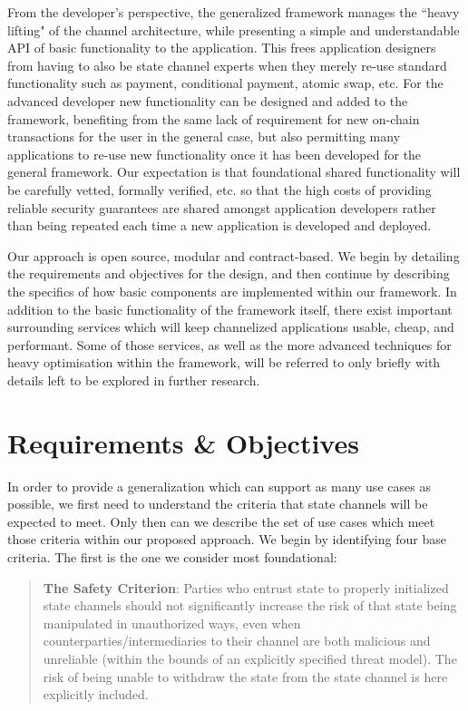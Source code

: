 \documentclass[prb,floatfix,reprint,nofootinbib,amsmath,amssymb,epsfig,pre,floats,letterpaper,groupedaffiliation,tightenlines,allcolors=blue,11pt]{revtex4}
\theoremstyle{definition}
\theoremstyle{definition}
\theoremstyle{definition}
\begin{document}
From the developer's perspective, the generalized framework manages the ``heavy lifting" of the channel architecture, while presenting a simple and understandable API of basic functionality to the application.  This frees application designers from having to also be state channel experts when they merely re-use standard functionality such as payment, conditional payment, atomic swap, etc.  For the advanced developer new functionality can be designed and added to the framework, benefiting from the same lack of requirement for new on-chain transactions for the user in the general case, but also permitting many applications to re-use new functionality once it has been developed for the general framework.  Our expectation is that foundational shared functionality will be carefully vetted, formally verified, etc. so that the high costs of providing reliable security guarantees are shared amongst application developers rather than being repeated each time a new application is developed and deployed.

Our approach is open source, modular and contract-based.  We begin by detailing the requirements and objectives for the design, and then continue by describing the specifics of how basic components are implemented within our framework.  In addition to the basic functionality of the framework itself, there exist important surrounding services which will keep channelized applications usable, cheap, and performant.  Some of those services, as well as the more advanced techniques for heavy optimisation within the framework, will be referred to only briefly with details left to be explored in further research.

\section{Requirements \& Objectives}
\label{section:requirements}

In order to provide a generalization which can support as many use cases as possible, we first need to understand the criteria that state channels will be expected to meet. Only then can we describe the set of use cases which meet those criteria within our proposed approach.  We begin by identifying four base criteria.  The first is the one we consider most foundational:

\begin{quote}
\textbf{The Safety Criterion}: Parties who entrust state to properly initialized state channels should not significantly increase the risk of that state being manipulated in unauthorized ways, even when counterparties/intermediaries to their channel are both malicious and unreliable (within the bounds of an explicitly specified threat model). The risk of being unable to withdraw the state from the state channel is here explicitly included.
\end{quote}
\end{document}
